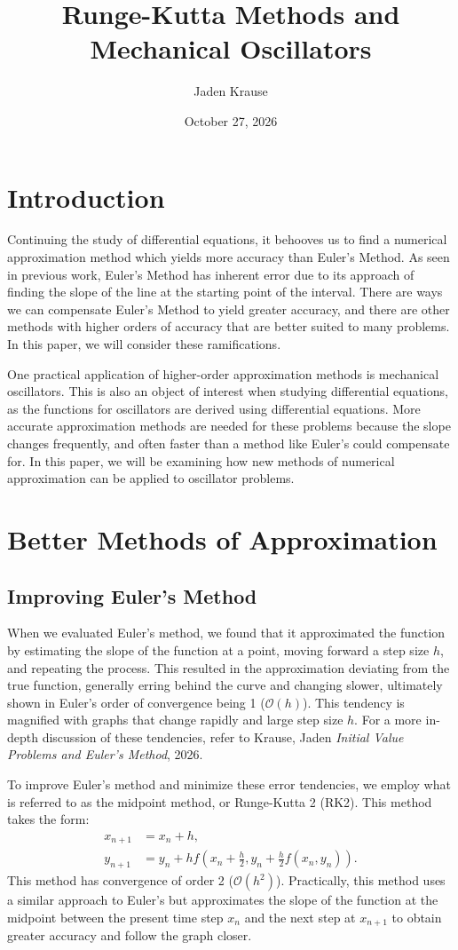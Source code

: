 \documentclass{article}
\title{Runge-Kutta Methods and Mechanical Oscillators}
\author{Jaden Krause}
\date{October 27, 2026}
\begin{document}
\maketitle

\section{Introduction}
Continuing the study of differential equations, it behooves us to find a numerical approximation method 
which yields more accuracy than Euler's Method. As seen in previous work, Euler's Method has inherent error 
due to its approach of finding the slope of the line at the starting point of the interval. There are 
ways we can compensate Euler's Method to yield greater accuracy, and there are other methods with higher 
orders of accuracy that are better suited to many problems. In this paper, we will consider these ramifications. 
\par One practical application of higher-order approximation methods is mechanical oscillators. This is 
also an object of interest when studying differential equations, as the functions for oscillators are 
derived using differential equations. More accurate approximation methods are needed for these problems 
because the slope changes frequently, and often faster than a method like Euler's could compensate for. 
In this paper, we will be examining how new methods of numerical approximation can be applied to oscillator 
problems.

\section{Better Methods of Approximation}
\subsection{Improving Euler's Method}
When we evaluated Euler's method, we found that it approximated the function by estimating the slope of the 
function at a point, moving forward a step size $h$, and repeating the process. This resulted in the approximation 
deviating from the true function, generally erring behind the curve and changing slower, ultimately shown 
in Euler's order of convergence being 1 ($\mathcal{O}(h)$). This tendency is magnified 
with graphs that change rapidly and large step size $h$. For a more in-depth discussion of these tendencies, refer 
to Krause, Jaden \textit{Initial Value Problems and Euler's Method}, 2026. 
\par To improve Euler's method and minimize these error tendencies, we employ what is referred to as the midpoint 
method, or Runge-Kutta 2 (RK2). This method takes the form: 
\begin{align*}
x_{n+1} &= x_n + h, \\
y_{n+1} &= y_n + hf(x_n + \frac{h}{2}, y_n + \frac{h}{2}f(x_n, y_n)).
\end{align*}
This method has convergence of order 2 ($\mathcal{O}(h^2)$). Practically, this method uses a similar approach to 
Euler's but approximates the slope of the function at the midpoint between the present time step $x_n$ and the 
next step at $x_{n+1}$ to obtain greater accuracy and follow the graph closer. 
\end{document}
